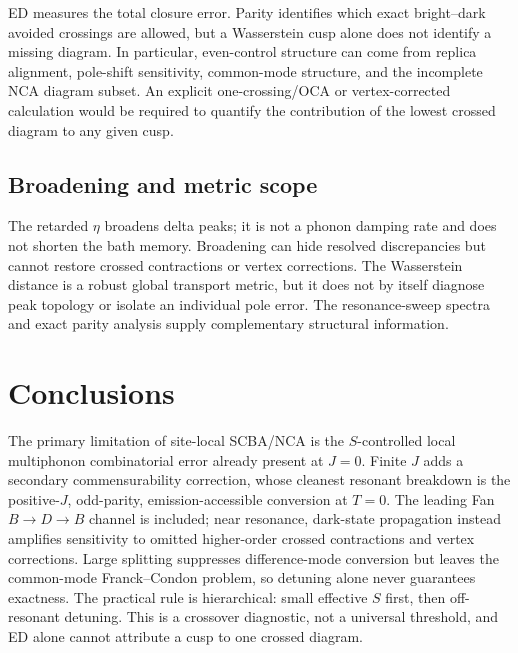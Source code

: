 \documentclass[11pt]{article}
\begin{document}
ED measures the total closure error.  Parity identifies which exact
bright--dark avoided crossings are allowed, but a Wasserstein cusp alone does
not identify a missing diagram.  In particular, even-control structure can
come from replica alignment, pole-shift sensitivity, common-mode structure,
and the incomplete NCA diagram subset.  An explicit one-crossing/OCA or
vertex-corrected calculation would be required to quantify the contribution
of the lowest crossed diagram to any given cusp.

\subsection{Broadening and metric scope}

The retarded $\eta$ broadens delta peaks; it is not a phonon damping rate and
does not shorten the bath memory.  Broadening can hide resolved discrepancies
but cannot restore crossed contractions or vertex corrections.  The
Wasserstein distance is a robust global transport metric, but it does not by
itself diagnose peak topology or isolate an individual pole error.  The
resonance-sweep spectra and exact parity analysis supply complementary
structural information.

\section{Conclusions}

The primary limitation of site-local SCBA/NCA is the $S$-controlled local
multiphonon combinatorial error already present at $J=0$.  Finite $J$ adds a
secondary commensurability correction, whose cleanest resonant breakdown is
the positive-$J$, odd-parity, emission-accessible conversion at $T=0$.  The
leading Fan $B\to D\to B$ channel is included; near resonance, dark-state
propagation instead amplifies sensitivity to omitted higher-order crossed
contractions and vertex corrections.  Large splitting suppresses difference-mode
conversion but leaves the common-mode Franck--Condon problem, so detuning
alone never guarantees exactness.  The practical rule is hierarchical: small
effective $S$ first, then off-resonant detuning.  This is a crossover
diagnostic, not a universal threshold, and ED alone cannot attribute a cusp
to one crossed diagram.
\end{document}
